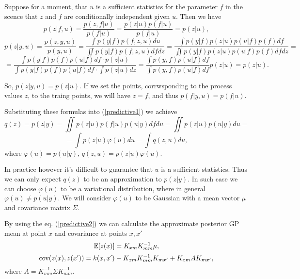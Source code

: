 \documentclass[12pt]{article}
\begin{document}
		Suppose for a moment, that $u$ is a sufficient statistics for the parameter $f$ in the scence that $z$ and $f$ are conditionally independent given $u$. Then we have 
		$$p(z|f, u) = \frac {p(z, f|u)} {p(f|u)} = \frac {p(z | u) p(f | u)}{p(f|u)} = p(z|u),$$
		$$p(z|y, u) = \frac {p(z, y, u)}{p(y, u)} = \frac {\int p(y|f)p(f, z, u) du}{\iint p(y|f) p(f, z, u) df dz} = \frac {\int p(y|f) p(z|u) p(u|f) p(f)df}{\iint p(y|f) p(z|u) p(u|f) p(f)df dz} = $$
		$$= \frac {\int p(y|f)p(f)p(u|f)df \cdot p(z|u)} {\int p(y|f)p(f)p(u|f)df \cdot \int p(z|u) dz} = \frac{\int p(y, f) p(u|f) df} {\int p(y, f) p(u|f) df} p(z|u) = p(z|u).$$

		So, $p(z|y, u) = p(z|u)$. If we set the points, corrwsponding to the process values $z$, to the traing points, we will have $z = f$, and thus $p(f|y, u) = p(f|u)$.

		Substituting these formulas into (\ref{predictive1}) we achieve
		$$q(z) = p(z|y) = \iint p(z|u) p(f|u) p(u|y)df du = \iint p(z|u) p(u|y) du = $$
		\begin{equation}
			\label{predictive2}
			= \int p(z|u)\varphi(u) du  = \int q(z, u) du, 
		\end{equation}
		where $\varphi(u) = p(u|y)$, $q(z, u) = p(z|u)\varphi(u)$.

		In practice however it's difficult to guarantee that $u$ is a sufficient statistics. Thus we can only expect $q(z)$ to be an approximation to $p(z|y)$. In such case we can choose $\varphi(u)$ to be a variational distribution, where in general $\varphi(u) \ne p(u | y)$. We will consider $\varphi(u)$ to be Gaussian with a mean vector $\mu$ and covariance matrix $\Sigma$.

		By using the eq. (\ref{predictive2}) we can calculate the approximate posterior GP mean at point $x$ and covariance at points $x, x'$
		$$\mathbb{E}[z(x)] = K_{xm} K_{mm}^{-1} \mu,$$ 
		$$\mbox{cov}(z(x), z(x')) = k(x, x') - K_{xm} K_{mm}^{-1} K_{mx'} + K_{xm} A K_{mx'},$$
		where $A = K_{mm}^{-1} \Sigma K_{mm}^{-1}$.
\end{document}
